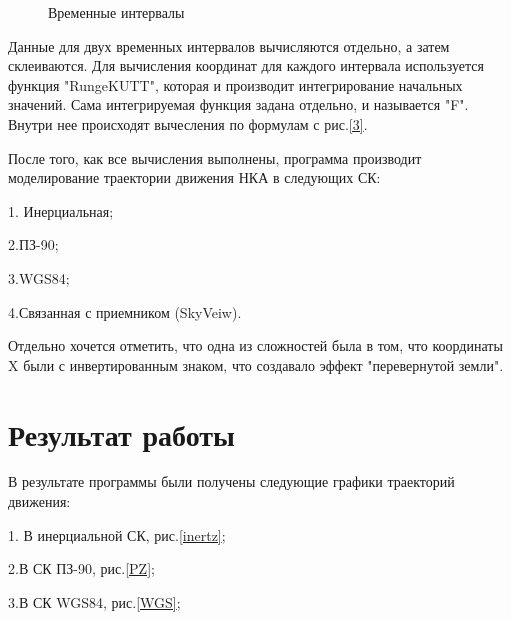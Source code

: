 \documentclass[]{article}
\begin{document}
 \begin{figure}[h!]
	
	\caption{Временные интервалы }
	\label{5}
\end{figure}

Данные для двух временных интервалов вычисляются отдельно, а затем склеиваются. Для вычисления координат для каждого интервала используется функция "RungeKUTT", которая и производит интегрирование начальных значений. Сама интегрируемая функция задана отдельно, и называется "F". Внутри нее происходят вычесления по формулам с рис.\ref{3}. 


После того, как все вычисления выполнены, программа производит моделирование траектории движения НКА в следующих СК:

1. Инерциальная;

2.ПЗ-90;

3.WGS84;

4.Связанная с приемником (SkyVeiw).

Отдельно хочется отметить, что одна из сложностей была в том, что координаты X были с инвертированным знаком, что создавало эффект "перевернутой земли".


\section{Результат работы}
В результате программы были получены следующие графики траекторий движения:

1. В инерциальной СК, рис.\ref{inertz};

2.В СК ПЗ-90, рис.\ref{PZ};

3.В СК WGS84, рис.\ref{WGS};
\end{document}
